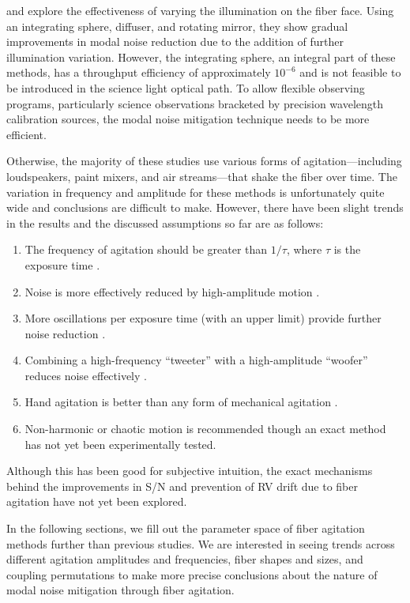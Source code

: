 \citet{mahadevan_suppression_2014} and \citet{halverson_habitable-zone_2014} explore the effectiveness of varying the illumination on the fiber face. Using an integrating sphere, diffuser, and rotating mirror, they show gradual improvements in modal noise reduction due to the addition of further illumination variation. However, the integrating sphere, an integral part of these methods, has a throughput efficiency of approximately $10^{-6}$ and is not feasible to be introduced in the science light optical path. To allow flexible observing programs, particularly science observations bracketed by precision wavelength calibration sources, the modal noise mitigation technique needs to be more efficient.

Otherwise, the majority of these studies use various forms of agitation---including loudspeakers, paint mixers, and air streams---that shake the fiber over time. The variation in frequency and amplitude for these methods is unfortunately quite wide and conclusions are difficult to make. However, there have been slight trends in the results and the discussed assumptions so far are as follows:
\begin{enumerate}
\item The frequency of agitation should be greater than $1/\tau$, where $\tau$ is the exposure time \citep{baudrand_modal_2001}.
\item Noise is more effectively reduced by high-amplitude motion \citep{lemke_modal_2011, mccoy_optical_2012}.
\item More oscillations per exposure time (with an upper limit) provide further noise reduction \citep{lemke_modal_2011}.
\item Combining a high-frequency ``tweeter'' with a high-amplitude ``woofer'' reduces noise effectively \citep{plavchan_precision_2013}.
\item Hand agitation is better than any form of mechanical agitation \citep{lemke_modal_2011, mccoy_optical_2012, mahadevan_suppression_2014, roy_scrambling_2014}.
\item Non-harmonic or chaotic motion is recommended \citep{grupp_nature_2003} though an exact method has not yet been experimentally tested.
\end{enumerate}
Although this has been good for subjective intuition, the exact mechanisms behind the improvements in S/N and prevention of RV drift due to fiber agitation have not yet been explored.

In the following sections, we fill out the parameter space of fiber agitation methods further than previous studies. We are interested in seeing trends across different agitation amplitudes and frequencies, fiber shapes and sizes, and coupling permutations to make more precise conclusions about the nature of modal noise mitigation through fiber agitation.

